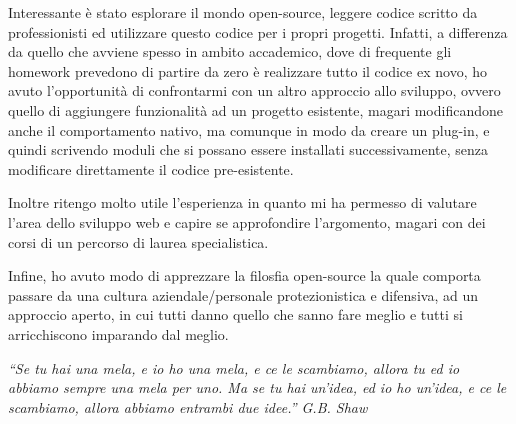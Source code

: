 \vspace{2.5 mm}
Interessante è stato esplorare il mondo open-source, leggere codice scritto da professionisti ed utilizzare questo codice per i propri progetti. Infatti, a differenza da quello che avviene spesso in ambito accademico, dove di frequente gli homework prevedono di partire da zero è realizzare tutto il codice ex novo, ho avuto l'opportunità di confrontarmi con un altro approccio allo sviluppo, ovvero quello di aggiungere funzionalità ad un progetto esistente, magari modificandone anche il comportamento nativo, ma comunque in modo da creare un plug-in, e quindi scrivendo moduli che si possano essere installati successivamente, senza modificare direttamente il codice pre-esistente. 

\vspace{2.5 mm}
Inoltre ritengo molto utile l'esperienza in quanto mi ha permesso di valutare l'area dello sviluppo web e capire se approfondire l'argomento, magari con dei corsi di un percorso di laurea specialistica.

\vspace{2.5 mm}
Infine, ho avuto modo di apprezzare la filosfia open-source la quale comporta passare da una cultura aziendale/personale protezionistica e difensiva, ad un approccio aperto, in cui tutti danno quello che sanno fare meglio e tutti si arricchiscono imparando dal meglio.

\vspace{2.5 mm}
\emph{“Se tu hai una mela, e io ho una mela, e ce le scambiamo, allora tu ed io abbiamo sempre una mela per uno. Ma se tu hai un’idea, ed io ho un’idea, e ce le scambiamo, allora abbiamo entrambi due idee.”
G.B. Shaw}